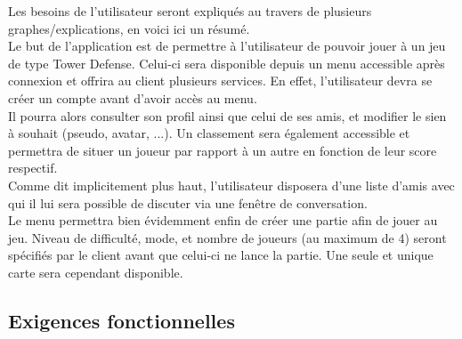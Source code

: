 \documentclass[10pt,a4paper]{article}
\begin{document}
\noindent Les besoins de l'\gls{utilisateur} seront expliqués au travers de plusieurs graphes/explications, en voici ici un résumé.\\
Le but de l'application est de permettre à l'\gls{utilisateur} de pouvoir jouer à un jeu de type Tower Defense. Celui-ci sera disponible depuis un menu accessible après connexion et offrira au \gls{client} plusieurs services. En effet, l'\gls{utilisateur} devra se créer un \gls{compte} avant d'avoir accès au menu.\\
Il pourra alors consulter son profil ainsi que celui de ses amis, et modifier le sien à souhait (pseudo, avatar, ...).
Un classement sera également accessible et permettra de situer un \gls{joueur} par rapport à un autre en fonction de leur score respectif.\\
Comme dit implicitement plus haut, l'\gls{utilisateur} disposera d'une liste d'amis avec qui il lui sera possible de discuter via une fenêtre de conversation.\\

\noindent Le menu permettra bien évidemment enfin de créer une partie afin de jouer au jeu. Niveau de difficulté, mode, et nombre de \glspl{joueur} (au maximum de 4) seront spécifiés par le \gls{client} avant que celui-ci ne lance la partie. Une seule et unique carte sera cependant disponible.
\subsection{Exigences fonctionnelles}
\end{document}
